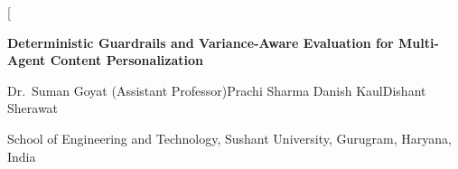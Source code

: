 \documentclass[9pt,twocolumn]{extarticle}
\newcommand{\figref}[1]{Fig.\ref{#1}}
\newcommand{\tabref}[1]{Table~\ref{#1}}
\newcommand{\tabnote}[1]{\par\vspace{2pt}\footnotesize\textit{Note:} #1}
\begin{document}

\twocolumn[
  \begin{@twocolumnfalse}
  \begin{center}
    {\large\bfseries Deterministic Guardrails and Variance-Aware
     Evaluation for Multi-Agent Content Personalization\par}
    \vspace{8pt}
    {\normalsize Dr.~Suman Goyat (Assistant Professor)\quad Prachi Sharma\quad
     Danish Kaul\quad Dishant Sherawat\par}
    \vspace{4pt}
    {\footnotesize School of Engineering and Technology,
     Sushant University, Gurugram, Haryana, India\par}
  \end{center}
  \vspace{10pt}


\end{@twocolumnfalse}
\end{document}
